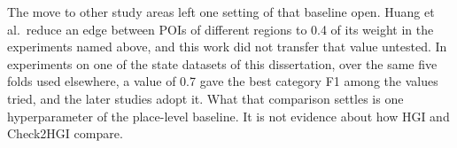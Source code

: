 The move to other study areas left one setting of that baseline open. Huang et al.\
reduce an edge between POIs of different regions to 0.4 of its weight in the
experiments named above, and this work did not transfer that value untested. In
experiments on one of the state datasets of this dissertation, over the same five
folds used elsewhere, a value of 0.7 gave the best category F1 among the values tried,
and the later studies adopt it. What that comparison settles is one hyperparameter of
the place-level baseline. It is not evidence about how HGI and Check2HGI compare.
